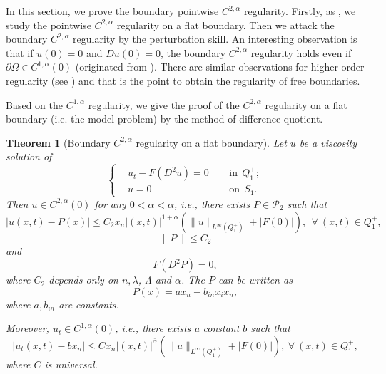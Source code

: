 \documentclass[preprint,12pt]{elsarticle}
\newtheorem{theorem}{Theorem}[section]
\theoremstyle{definition}
\theoremstyle{remark}
\numberwithin{equation}{section}
\begin{document}
In this section, we prove the boundary pointwise $C^{2,\alpha}$ regularity. Firstly, as , we study the pointwise $C^{2,\alpha}$ regularity on a flat boundary. Then we attack the boundary $C^{2,\alpha}$ regularity by the perturbation skill. An interesting observation is that if $u(0)=0$ and $Du(0)=0$, the boundary  $C^{2,\alpha}$ regularity holds even if $\partial \Omega\in C^{1,\alpha}(0)$ (originated from \cite{MR4088470}). There are similar observations for higher order regularity (see ) and that is the point to obtain the regularity of free boundaries.

Based on the $C^{1,\alpha}$ regularity, we give the proof of the $C^{2,\alpha}$ regularity on a flat boundary (i.e. the model problem) by the method of difference quotient.
\begin{theorem}[Boundary $C^{2,\alpha}$ regularity on a flat boundary]\label{Th1C2aF}
  Let $u$ be a viscosity solution of
  \begin{equation}\label{e.C2a.F}
\left\{\begin{aligned}
&u_t-F(D^2u)=0&& ~~\mbox{in}~~Q_1^+;\\
&u=0&& ~~\mbox{on}~~S_1.
\end{aligned}\right.
\end{equation}
Then $u\in C^{2,\alpha}(0)$ for any $0<\alpha<\bar{\alpha}$, i.e., there exists $P\in\mathcal{P}_2$ such that
\begin{equation}\label{e.C2a.F2}
|u(x,t)-P(x)|\leq C_2 x_n|(x,t)|^{1+\alpha}\left(\|u\|_{L^{\infty}(Q_1^+)}+|F(0)|\right),~~\forall~(x,t)\in Q^+_{1},
\end{equation}
\begin{equation*}
  \|P\|\leq C_2
\end{equation*}
and
\begin{equation}\label{e.C2a.F2.2}
F(D^2P)=0,
\end{equation}
where $C_2$ depends only on $n, \lambda$, $\Lambda$ and $\alpha$. The $P$ can be written as
\begin{equation*}
P(x)=ax_n-b_{in}x_ix_n,
\end{equation*}
where $a,b_{in}$ are constants.

Moreover, $u_t \in C^{1,\bar{\alpha}}(0)$, i.e., there exists a constant $b$ such that
\begin{equation*}
  |u_t(x,t)-bx_n|\leq Cx_n|(x,t)|^{\bar{\alpha}}\left(\|u\|_{L^{\infty}(Q_1^+)}+|F(0)|\right),~\forall ~(x,t)\in Q_{1}^+,
\end{equation*}
where $C$ is universal.
\end{theorem}
\end{document}
